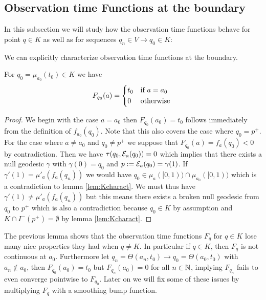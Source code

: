 \subsection{Observation time Functions at the boundary}
In this subsection we will study how the observation time functions behave for point $q\in K$ as well as for sequences $q_n \in V \to q_0\in K$:

We can explicitly characterize observation time functions at the boundary.
\begin{lemma}\label{lem:boundaryF}
    For $q_0=\mu_{a_0}(t_0)\in K$ we have 
    \begin{equation*}
        F_{q_0}(a) = 
        \begin{cases*}
            t_0 & if $a=a_0$ \\
            0 & otherwise
        \end{cases*}
    \end{equation*}
\end{lemma}
\begin{proof}
    We begin with the case $a=a_0$ then $F_{q_0}(a_0)=t_0$ follows immediately from the definition of $f_{a_0}(q_0)$. Note that this also covers the case where $q_0=p^+$. For the case where $a\neq a_0$ and $q_0\neq p^+$ we suppose that $F_{q_0}(a)=f_a(q_0)<0$ by contradiction. Then we have $\tau(q_0,{\mathcal{E}}_a(q_0))=0$ which implies that there exists a null geodesic $\gamma$ with $\gamma(0)=q_0$ and $p:={\mathcal{E}}_a(q_0)=\gamma(1)$. If $\gamma'(1)=\mu'_a(f_a(q_n))$ we would have $q_0\in \mu_a([0,1)) \cap \mu_{a_0}([0,1))$ which is a contradiction to lemma \ref{lem:Kcharact}. We must thus have $\gamma'(1)\neq\mu'_a(f_a(q_n))$ but this means there exists a broken null geodesic from $q_0$ to $p^+$ which is also a contradiction because $q_0\in K$ by assumption and $K\cap I^-(p^+)=\emptyset$ by lemma \ref{lem:Kcharact}.
\end{proof}
\begin{remark}
    The previous lemma shows that the observation time functions $F_q$ for $q\in K$ lose many nice properties they had when $q\neq K$. In particular if $q\in K$, then $F_q$ is not continuous at $a_0$. Furthermore let $q_n=\Theta(a_n,t_0)\to q_0=\Theta(a_0,t_0)$ with $a_n \notin a_0$, then $F_{q_0}(a_0)=t_0$ but $F_{q_n}(a_0)=0$ for all $n\in \mathbb{N}$, implying $F_{q_n}$ fails to even converge pointwise to $F_{q_0}$. Later on we will fix some of these issues by multiplying $F_q$ with a smoothing bump function.
\end{remark}

